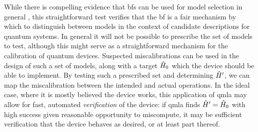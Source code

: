 While there is compelling evidence that \glspl{bf} can be used for model selection in general \cite{berger1996intrinsic}, 
    this straightforward test verifies that the \gls{bf} is a fair mechanism by which to distinguish between 
    models in the context of candidate descriptions for quantum systems. 
In general it will not be possible to prescribe the set of models to test, 
    although this might serve as a straightforward mechanism for the calibration of quantum devices.
Suspected miscalibrations can be used in the design of such a set of models, 
    along with a target $\hat{H}_0$ which the device should be able to implement. 
By testing such a prescribed set and determining $\hat{H}^{\prime}$, 
    we can map the miscalibration between the intended and actual operations. 
In the ideal case, where it is mostly believed the device works, 
    this application of \gls{qmla} may allow for fast, automated \emph{verification} of the device:
    if \gls{qmla} finds $\hat{H}^{\prime}=\hat{H}_0$ with high success given reasonable opportunity to miscompute, 
    it may be sufficient verification that the device behaves as desired, 
    or at least part thereof. 

